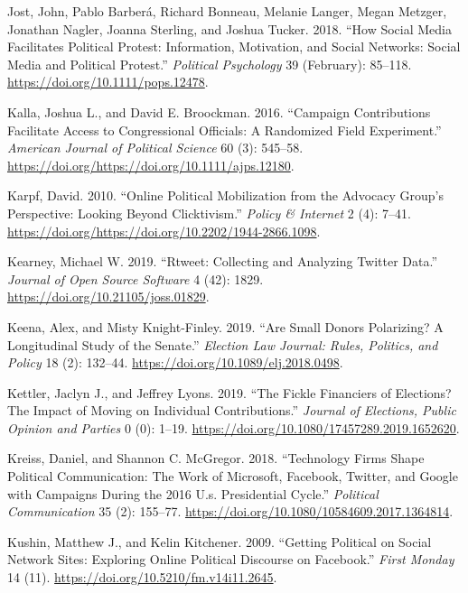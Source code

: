 \documentclass[12pt,]{article}
\begin{document}
\leavevmode\hypertarget{ref-jost2018}{}%
Jost, John, Pablo Barberá, Richard Bonneau, Melanie Langer, Megan
Metzger, Jonathan Nagler, Joanna Sterling, and Joshua Tucker. 2018.
``How Social Media Facilitates Political Protest: Information,
Motivation, and Social Networks: Social Media and Political Protest.''
\emph{Political Psychology} 39 (February): 85--118.
\url{https://doi.org/10.1111/pops.12478}.

\leavevmode\hypertarget{ref-kalla2015}{}%
Kalla, Joshua L., and David E. Broockman. 2016. ``Campaign Contributions
Facilitate Access to Congressional Officials: A Randomized Field
Experiment.'' \emph{American Journal of Political Science} 60 (3):
545--58. \url{https://doi.org/https://doi.org/10.1111/ajps.12180}.

\leavevmode\hypertarget{ref-karpf2010}{}%
Karpf, David. 2010. ``Online Political Mobilization from the Advocacy
Group's Perspective: Looking Beyond Clicktivism.'' \emph{Policy \&
Internet} 2 (4): 7--41.
\url{https://doi.org/https://doi.org/10.2202/1944-2866.1098}.

\leavevmode\hypertarget{ref-rtweet}{}%
Kearney, Michael W. 2019. ``Rtweet: Collecting and Analyzing Twitter
Data.'' \emph{Journal of Open Source Software} 4 (42): 1829.
\url{https://doi.org/10.21105/joss.01829}.

\leavevmode\hypertarget{ref-keena2019}{}%
Keena, Alex, and Misty Knight-Finley. 2019. ``Are Small Donors
Polarizing? A Longitudinal Study of the Senate.'' \emph{Election Law
Journal: Rules, Politics, and Policy} 18 (2): 132--44.
\url{https://doi.org/10.1089/elj.2018.0498}.

\leavevmode\hypertarget{ref-kettler2019}{}%
Kettler, Jaclyn J., and Jeffrey Lyons. 2019. ``The Fickle Financiers of
Elections? The Impact of Moving on Individual Contributions.''
\emph{Journal of Elections, Public Opinion and Parties} 0 (0): 1--19.
\url{https://doi.org/10.1080/17457289.2019.1652620}.

\leavevmode\hypertarget{ref-kreiss2018}{}%
Kreiss, Daniel, and Shannon C. McGregor. 2018. ``Technology Firms Shape
Political Communication: The Work of Microsoft, Facebook, Twitter, and
Google with Campaigns During the 2016 U.s. Presidential Cycle.''
\emph{Political Communication} 35 (2): 155--77.
\url{https://doi.org/10.1080/10584609.2017.1364814}.

\leavevmode\hypertarget{ref-kushin2009}{}%
Kushin, Matthew J., and Kelin Kitchener. 2009. ``Getting Political on
Social Network Sites: Exploring Online Political Discourse on
Facebook.'' \emph{First Monday} 14 (11).
\url{https://doi.org/10.5210/fm.v14i11.2645}.
\end{document}
